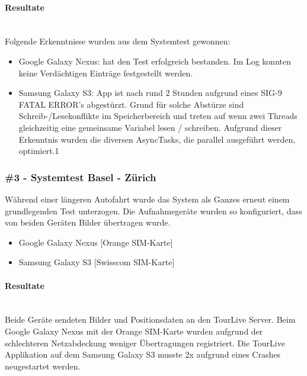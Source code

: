 \paragraph*{Resultate} \mbox{} \\
Folgende Erkenntnisse wurden aus dem Systemtest gewonnen:
\begin{itemize}[noitemsep,topsep=0pt]
	\item Google Galaxy Nexus: hat den Test erfolgreich bestanden. Im Log konnten keine Verdächtigen Einträge festgestellt werden.
	\item Samsung Galaxy S3: App ist nach rund 2 Stunden aufgrund eines SIG-9 FATAL ERROR's abgestürzt. Grund für solche Abstürze sind Schreib-/Lesekonflikte im Speicherbereich und treten auf wenn zwei Threads gleichzeitig eine gemeinsame Variabel lesen / schreiben. Aufgrund dieser Erkenntnis wurden die diversen AsyncTasks, die parallel ausgeführt werden, optimiert.1
\end{itemize}



\subsubsection{\#3 - Systemtest Basel - Zürich}
Während einer längeren Autofahrt wurde das System als Ganzes erneut einem grundlegenden Test unterzogen. Die Aufnahmegeräte wurden so konfiguriert, dass von beiden Geräten Bilder übertragen wurde.

\begin{itemize} [noitemsep,topsep=0pt]
	\item Google Galaxy Nexus [Orange SIM-Karte]
	\item Samsung Galaxy S3 [Swisscom SIM-Karte]
\end{itemize}

\paragraph*{Resultate} \mbox{} \\
Beide Geräte sendeten Bilder und Positionsdaten an den TourLive Server. Beim Google Galaxy Nexus mit der Orange SIM-Karte wurden aufgrund der schlechteren Netzabdeckung weniger Übertragungen registriert. Die TourLive Applikation auf dem Samsung Galaxy S3 musste 2x aufgrund eines Crashes neugestartet werden.

